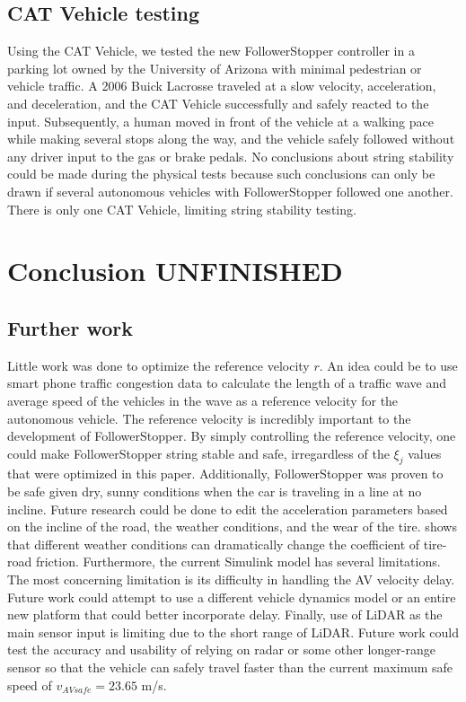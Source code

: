 \documentclass[conference]{IEEEtran}
\begin{document}
\subsection{CAT Vehicle testing}
Using the CAT Vehicle, we tested the new FollowerStopper controller in a parking lot owned by the University of Arizona with minimal pedestrian or vehicle traffic. A 2006 Buick Lacrosse traveled at a slow velocity, acceleration, and deceleration, and the CAT Vehicle successfully and safely reacted to the input. Subsequently, a human moved in front of the vehicle at a walking pace while making several stops along the way, and the vehicle safely followed without any driver input to the gas or brake pedals. No conclusions about string stability could be made during the physical tests because such conclusions can only be drawn if several autonomous vehicles with FollowerStopper followed one another. There is only one CAT Vehicle, limiting string stability testing.






\section{Conclusion UNFINISHED}

\subsection{Further work}
Little work was done to optimize the reference velocity $r$. An idea could be to use smart phone traffic congestion data to calculate the length of a traffic wave and average speed of the vehicles in the wave as a reference velocity for the autonomous vehicle. The reference velocity is incredibly important to the development of FollowerStopper. By simply controlling the reference velocity, one could make FollowerStopper string stable and safe, irregardless of the $\xi_j$ values that were optimized in this paper. Additionally, FollowerStopper was proven to be safe given dry, sunny conditions when the car is traveling in a line at no incline. Future research could be done to edit the acceleration parameters based on the incline of the road, the weather conditions, and the wear of the tire. \cite{muller2003estimation} shows that different weather conditions can dramatically change the coefficient of tire-road friction. Furthermore, the current Simulink model has several limitations. The most concerning limitation is its difficulty in handling the AV velocity delay. Future work could attempt to use a different vehicle dynamics model or an entire new platform that could better incorporate delay. Finally, use of LiDAR as the main sensor input is limiting due to the short range of LiDAR. Future work could test the accuracy and usability of relying on radar or some other longer-range sensor so that the vehicle can safely travel faster than the current maximum safe speed of $v_{AVsafe}=23.65$ m/s.
\end{document}
